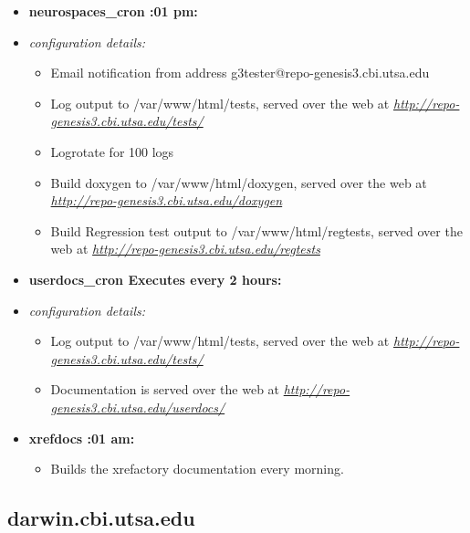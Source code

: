 \documentclass[12pt]{article}
\begin{document}
\begin{itemize}
\begin{itemize}
\item[] {\bf neurospaces\_cron :01 pm:}
	\item {\it configuration details:} 
\begin{itemize}

	\item Email notification from address g3tester@repo-genesis3.cbi.utsa.edu
	\item Log output to /var/www/html/tests, served over the web at \href{http://repo-genesis3.cbi.utsa.edu/tests/}{\it http://repo-genesis3.cbi.utsa.edu/tests/}
	\item Logrotate for 100 logs
	\item Build doxygen to /var/www/html/doxygen, served over the web at \href{http://repo-genesis3.cbi.utsa.edu/doxygen}{\it http://repo-genesis3.cbi.utsa.edu/doxygen}
	\item Build Regression test output to /var/www/html/regtests, served over the web at \href{http://repo-genesis3.cbi.utsa.edu/regtests}{\it http://repo-genesis3.cbi.utsa.edu/regtests}
\end{itemize}

\item[] {\bf userdocs\_cron \- Executes every 2 hours:}
	\item {\it configuration details:} 
\begin{itemize}

	\item Log output to /var/www/html/tests, served over the web at \href{http://repo-genesis3.cbi.utsa.edu/tests/}{\it http://repo-genesis3.cbi.utsa.edu/tests/}
	\item Documentation is served over the web at \href{http://repo-genesis3.cbi.utsa.edu/userdocs/}{\it http://repo-genesis3.cbi.utsa.edu/userdocs/}
\end{itemize}

\item[] {\bf xrefdocs :01 am:}
\begin{itemize}
	\item Builds the xrefactory documentation every morning. 
\end{itemize}
\end{itemize}

\end{itemize}








\subsection*{\bf darwin.cbi.utsa.edu}
\end{document}
